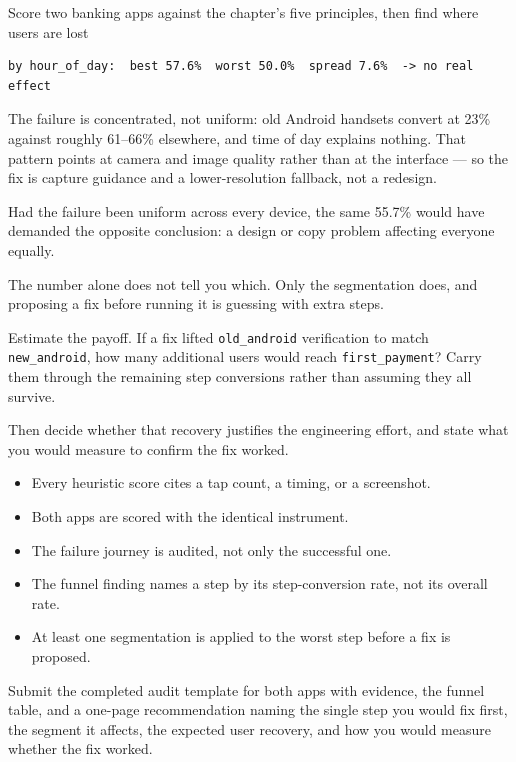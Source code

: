 \begin{labproject}{Score two banking apps against the chapter's five principles, then find where users are lost}
\begin{lstlisting}[style=mlterminal]
by hour_of_day:  best 57.6%  worst 50.0%  spread 7.6%  -> no real effect
\end{lstlisting}

The failure is concentrated, not uniform: old Android handsets convert at 23\% against roughly 61--66\% elsewhere, and time of day explains nothing. That pattern points at camera and image quality rather than at the interface --- so the fix is capture guidance and a lower-resolution fallback, not a redesign.

\begin{pitfall}
Had the failure been uniform across every device, the same 55.7\% would have demanded the opposite conclusion: a design or copy problem affecting everyone equally.

The number alone does not tell you which. Only the segmentation does, and proposing a fix before running it is guessing with extra steps.
\end{pitfall}

\begin{tryit}
Estimate the payoff. If a fix lifted \texttt{old\_android} verification to match \texttt{new\_android}, how many additional users would reach \texttt{first\_payment}? Carry them through the remaining step conversions rather than assuming they all survive.

Then decide whether that recovery justifies the engineering effort, and state what you would measure to confirm the fix worked.
\end{tryit}
\end{labproject}

\begin{verification}
\begin{itemize}
  \item Every heuristic score cites a tap count, a timing, or a screenshot.
  \item Both apps are scored with the identical instrument.
  \item The failure journey is audited, not only the successful one.
  \item The funnel finding names a step by its step-conversion rate, not its overall rate.
  \item At least one segmentation is applied to the worst step before a fix is proposed.
\end{itemize}
\end{verification}

\begin{labdeliverable}
Submit the completed audit template for both apps with evidence, the funnel table, and a one-page recommendation naming the single step you would fix first, the segment it affects, the expected user recovery, and how you would measure whether the fix worked.
\end{labdeliverable}
